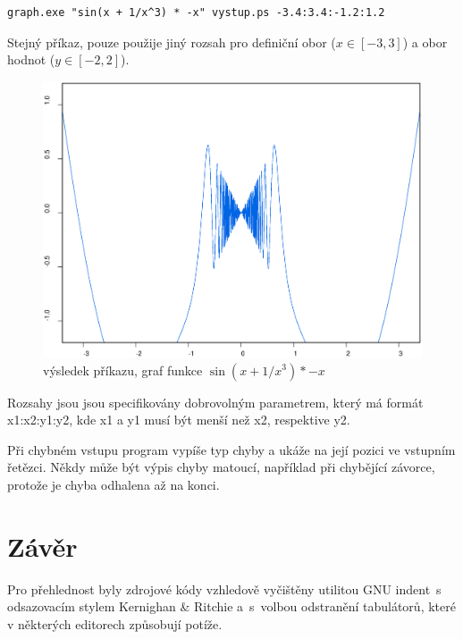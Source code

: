 \documentclass[11pt]{article}
\begin{document}
\begin{verbatim}
graph.exe "sin(x + 1/x^3) * -x" vystup.ps -3.4:3.4:-1.2:1.2
\end{verbatim}
Stejný příkaz, pouze použije jiný rozsah pro definiční obor ($x \in [-3, 3]$) a
obor hodnot ($y \in [-2, 2]$).
\begin{figure}[ht!]
\centering
	\includegraphics[width=13cm]{figures/test2.eps}
	\caption{výsledek příkazu, graf funkce $\sin \left(x + 1/x^3 \right) * -x$}
\end{figure}


Rozsahy jsou jsou specifikovány dobrovolným parametrem, který má formát
x1:x2:y1:y2, kde x1 a y1 musí být menší než x2, respektive y2. 

Při chybném vstupu program vypíše typ chyby a ukáže na její pozici ve vstupním
řetězci. Někdy může být výpis chyby matoucí, například při chybějící závorce,
protože je chyba odhalena až na konci.


\section{Závěr}
Pro přehlednost byly zdrojové kódy vzhledově vyčištěny utilitou GNU indent~s
odsazovacím stylem Kernighan \& Ritchie a~s~volbou odstranění tabulátorů, které
v některých editorech způsobují potíže.
\end{document}
